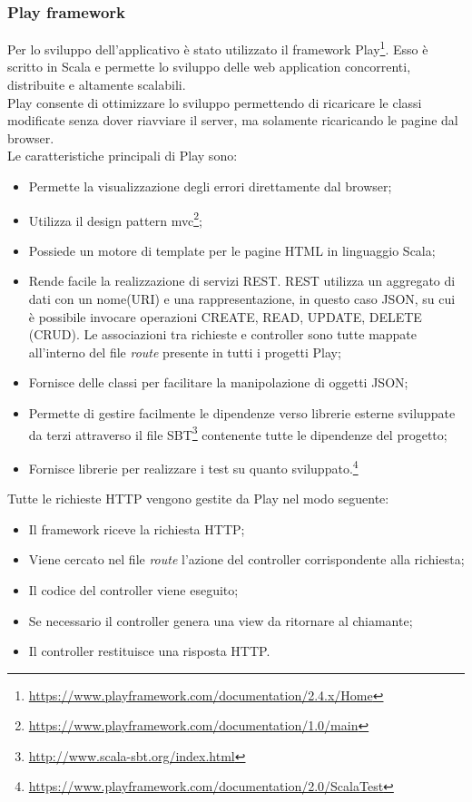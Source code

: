 \subsubsection*{Play framework}
Per lo sviluppo dell'applicativo è stato utilizzato il \gls{framework} Play\footnote{\url{https://www.playframework.com/documentation/2.4.x/Home}}. Esso è scritto in Scala e permette lo sviluppo delle web application concorrenti, distribuite e altamente scalabili. \\
Play consente di ottimizzare lo sviluppo permettendo di ricaricare le classi modificate senza dover riavviare il server, ma solamente ricaricando le pagine dal browser.\\
Le caratteristiche principali di Play sono:
\begin{itemize}
	\item Permette la visualizzazione degli errori direttamente dal browser;
	\item Utilizza il design pattern \gls{mvc}\footnote{\url{https://www.playframework.com/documentation/1.0/main}};
	\item Possiede un motore di template per le pagine HTML in linguaggio Scala;
	\item Rende facile la realizzazione di servizi \gls{REST}. \gls{REST} utilizza un aggregato di dati con un nome(\gls{URI}) e una rappresentazione, in questo caso \gls{JSON}, su cui è possibile invocare operazioni CREATE, READ, UPDATE, DELETE (CRUD). Le associazioni tra richieste e controller sono tutte mappate all'interno del file \textit{route} presente in tutti i progetti Play;
	\item Fornisce delle classi per facilitare la manipolazione di oggetti \gls{JSON};
	\item Permette di gestire facilmente le dipendenze verso librerie esterne sviluppate da terzi attraverso il file SBT\footnote{\url{http://www.scala-sbt.org/index.html}} contenente tutte le dipendenze del progetto;
	\item Fornisce librerie per realizzare i test su quanto sviluppato.\footnote{\url{https://www.playframework.com/documentation/2.0/ScalaTest}}
\end{itemize}
Tutte le richieste HTTP vengono gestite da Play nel modo seguente:
\begin{itemize}
	\item Il \gls{framework} riceve la richiesta HTTP;
	\item Viene cercato nel file \textit{route} l'azione del controller corrispondente alla richiesta;
	\item Il codice del controller viene eseguito;
	\item Se necessario il controller genera una view da ritornare al chiamante;
	\item Il controller restituisce una risposta HTTP.
\end{itemize}
